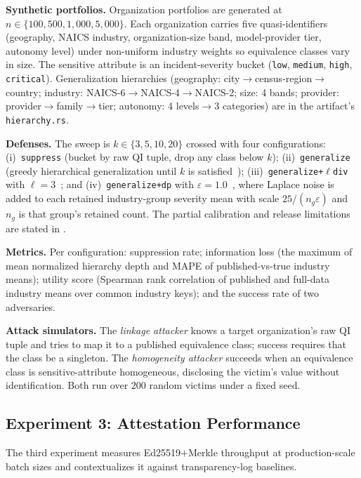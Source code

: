 \textbf{Synthetic portfolios.} Organization portfolios are generated at $n \in \{100, 500, 1{,}000, 5{,}000\}$. Each organization carries five quasi-identifiers (geography, NAICS industry, organization-size band, model-provider tier, autonomy level) under non-uniform industry weights so equivalence classes vary in size. The sensitive attribute is an incident-severity bucket (\texttt{low}, \texttt{medium}, \texttt{high}, \texttt{critical}). Generalization hierarchies (geography: city$\to$census-region$\to$country; industry: NAICS-6$\to$NAICS-4$\to$NAICS-2; size: 4 bands; provider: provider$\to$family$\to$tier; autonomy: 4 levels$\to$3 categories) are in the artifact's \texttt{hierarchy.rs}.

\textbf{Defenses.} The sweep is $k \in \{3, 5, 10, 20\}$ crossed with four configurations: (i)~\texttt{suppress} (bucket by raw QI tuple, drop any class below $k$); (ii)~\texttt{generalize} (greedy hierarchical generalization until $k$ is satisfied~\cite{lefevre_2006_mondrian}); (iii)~\texttt{generalize+}$\ell$\texttt{div} with $\ell{=}3$~\cite{machanavajjhala_2007_ldiversity}; and (iv)~\texttt{generalize+dp} with $\varepsilon{=}1.0$~\cite{dwork_2014_dp}, where Laplace noise is added to each retained industry-group severity mean with scale $25/(n_g\varepsilon)$ and $n_g$ is that group's retained count. The partial calibration and release limitations are stated in .

\textbf{Metrics.} Per configuration: suppression rate; information loss (the maximum of mean normalized hierarchy depth and MAPE of published-vs-true industry means); utility score (Spearman rank correlation of published and full-data industry means over common industry keys); and the success rate of two adversaries.

\textbf{Attack simulators.} The \emph{linkage attacker} knows a target organization's raw QI tuple and tries to map it to a published equivalence class; success requires that the class be a singleton. The \emph{homogeneity attacker} succeeds when an equivalence class is sensitive-attribute homogeneous, disclosing the victim's value without identification. Both run over $200$ random victims under a fixed seed.

\subsection{Experiment 3: Attestation Performance}
\label{sec:ex3}

The third experiment measures Ed25519$+$Merkle throughput at production-scale batch sizes and contextualizes it against transparency-log baselines.

